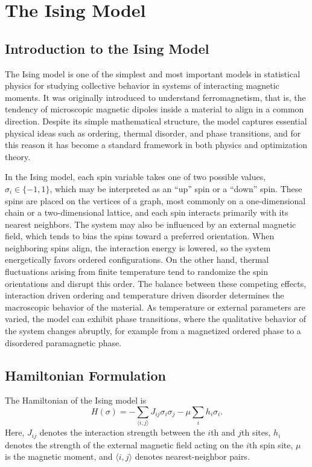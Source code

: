\documentclass[english,12pt,a4paper]{report}
\begin{document}
	\chapter{The Ising Model}
	\section{Introduction to the Ising Model}
	\hspace{1.15em}The Ising model is one of the simplest and most important models in statistical physics for studying collective behavior in systems of interacting magnetic moments. It was originally introduced to understand ferromagnetism, that is, the tendency of microscopic magnetic dipoles inside a material to align in a common direction. Despite its simple mathematical structure, the model captures essential physical ideas such as ordering, thermal disorder, and phase transitions, and for this reason it has become a standard framework in both physics and optimization theory.
	
	In the Ising model, each spin variable takes one of two possible values, $\sigma_i\in\{-1,1\}$, which may be interpreted as an ``up'' spin or a ``down'' spin. These spins are placed on the vertices of a graph, most commonly on a one-dimensional chain or a two-dimensional lattice, and each spin interacts primarily with its nearest neighbors. The system may also be influenced by an external magnetic field, which tends to bias the spins toward a preferred orientation. When neighboring spins align, the interaction energy is lowered, so the system energetically favors ordered configurations. On the other hand, thermal fluctuations arising from finite temperature tend to randomize the spin orientations and disrupt this order. The balance between these competing effects, interaction driven ordering and temperature driven disorder determines the macroscopic behavior of the material. As temperature or external parameters are varied, the model can exhibit phase transitions, where the qualitative behavior of the system changes abruptly, for example from a magnetized ordered phase to a disordered paramagnetic phase.
	
	\section{Hamiltonian Formulation}
	\hspace{1.15em}The Hamiltonian of the Ising model is
	\[
	H(\sigma)=-\sum_{\langle i,j \rangle}J_{ij}\sigma_i\sigma_j-\mu \sum_i h_i\sigma_i.
	\]
	Here, $J_{ij}$ denotes the interaction strength between the $i$th and $j$th sites, $h_i$ denotes the strength of the external magnetic field acting on the $i$th spin site, $\mu$ is the magnetic moment, and $\langle i,j \rangle$ denotes nearest-neighbor pairs.
	
\end{document}
